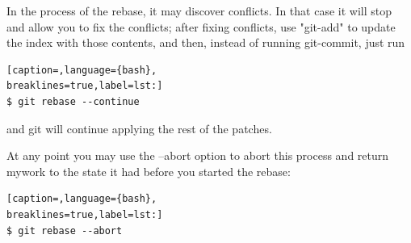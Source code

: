 In the process of the rebase, it may discover conflicts. In that case it will
stop and allow you to fix the conflicts; after fixing conflicts, use "git-add"
to update the index with those contents, and then, instead of running
git-commit, just run
\lstset{basicstyle=\scriptsize, numbers=none, captionpos=b, tabsize=4}
\begin{lstlisting}[caption=,language={bash},
breaklines=true,label=lst:]
$ git rebase --continue
\end{lstlisting}

and git will continue applying the rest of the patches.

At any point you may use the --abort option to abort this process and return
mywork to the state it had before you started the rebase:

\lstset{basicstyle=\scriptsize, numbers=none, captionpos=b, tabsize=4}
\begin{lstlisting}[caption=,language={bash},
breaklines=true,label=lst:]
$ git rebase --abort
\end{lstlisting}
